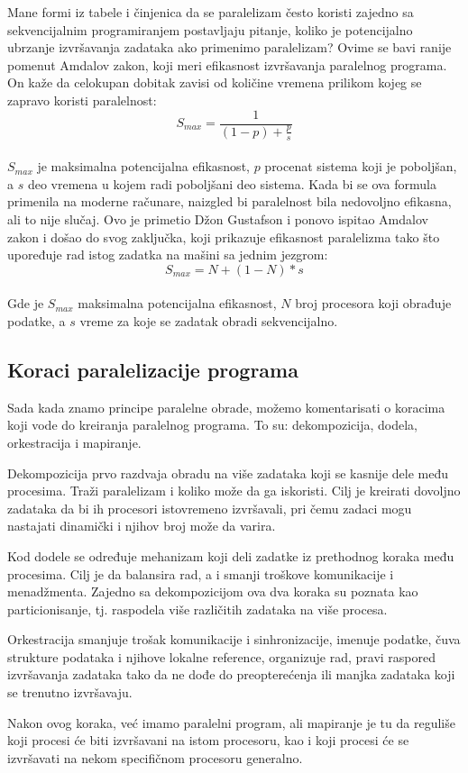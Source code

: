 \documentclass[a4paper]{article}
\begin{document}
{Mane formi iz tabele i činjenica da se paralelizam često koristi zajedno sa sekvencijalnim programiranjem postavljaju pitanje, koliko je potencijalno ubrzanje izvršavanja zadataka ako primenimo paralelizam? Ovime se bavi ranije pomenut Amdalov zakon, koji meri efikasnost izvršavanja paralelnog programa. On kaže da celokupan dobitak zavisi od količine vremena prilikom kojeg se zapravo koristi paralelnost: \\
\begin{equation*}
S_{max} = \frac{1}{(1 - p) + \frac{p}{s}}
\end{equation*}\\
$S_{max}$ je maksimalna potencijalna efikasnost, $p$ procenat sistema koji je poboljšan, a $s$ deo vremena u kojem radi poboljšani deo sistema. Kada bi se ova formula primenila na moderne računare, naizgled bi paralelnost bila nedovoljno efikasna, ali to nije slučaj. Ovo je primetio Džon Gustafson i ponovo ispitao Amdalov zakon i došao do svog zaključka, koji prikazuje efikasnost paralelizma tako što upoređuje rad istog zadatka na mašini sa jednim jezgrom:\\
\begin{equation*}
S_{max} = N + (1 - N) * s
\end{equation*}\\
Gde je $S_{max}$ maksimalna potencijalna efikasnost, $N$ broj procesora koji obrađuje podatke, a $s$ vreme za koje se zadatak obradi sekvencijalno.
\subsection{Koraci paralelizacije programa}
Sada kada znamo principe paralelne obrade, možemo komentarisati o koracima koji vode do kreiranja paralelnog programa. To su: dekompozicija, dodela, orkestracija i mapiranje.\par
Dekompozicija prvo razdvaja obradu na više zadataka koji se kasnije dele među procesima. Traži paralelizam i koliko može da ga iskoristi. Cilj je kreirati dovoljno zadataka da bi ih procesori istovremeno izvršavali, pri čemu zadaci mogu nastajati dinamički i njihov broj može da varira.\par 
Kod dodele se određuje mehanizam koji deli zadatke iz prethodnog koraka među procesima. Cilj je da balansira rad, a i smanji troškove komunikacije i menadžmenta. Zajedno sa dekompozicijom ova dva koraka su poznata kao particionisanje, tj. raspodela više različitih zadataka na više procesa. \par 
Orkestracija smanjuje trošak komunikacije i sinhronizacije, imenuje podatke, čuva strukture podataka i njihove lokalne reference, organizuje rad, pravi raspored izvršavanja zadataka tako da ne dođe do preopterećenja ili manjka zadataka koji se trenutno izvršavaju. \par 
Nakon ovog koraka, već imamo paralelni program, ali mapiranje je tu da reguliše koji procesi će biti izvršavani na istom procesoru, kao i koji procesi će se izvršavati na nekom specifičnom procesoru generalno. 
}
\end{document}
